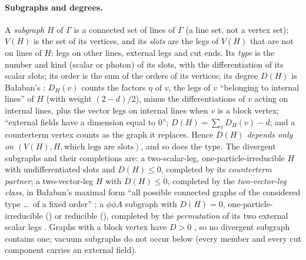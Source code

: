 \paragraph{Subgraphs and degrees.} A \emph{subgraph} $H$ of $\Gamma$ is a connected set of lines of $\Gamma$ (a line set, not a vertex set); $V(H)$ is the set of its vertices, and its \emph{slots} are the legs of $V(H)$ that are not on lines of $H$: legs on other lines, external legs and cut ends. Its \emph{type} is the number and kind (scalar or photon) of its slots, with the differentiation of its scalar slots; its order is the sum of the orders of its vertices; its degree $D(H)$ is Ba{\l}aban's \cite[(2.1)--(2.3)]{Ba3}: $D_H(v)$ counts the factors $\eta$ of $v$, the legs of $v$ ``belonging to internal lines'' of $H$ (with weight $(2-d)/2$), minus the differentiations of $v$ acting on internal lines, plus the vector legs on internal lines when $v$ is a block vertex; ``external fields have a dimension equal to $0$''; $D(H)=\sum_{v}D_H(v)-d$; and a counterterm vertex counts as the graph it replaces. Hence \emph{$D(H)$ depends only on $(V(H),H,\text{which legs are slots})$}, and so does the type. The divergent subgraphs and their completions \cite[pp.~420, 429--432]{Ba3} are: a two-scalar-leg, one-particle-irreducible $H$ with undifferentiated slots and $D(H)\le0$, completed by its \emph{counterterm partner}; a two-vector-leg $H$ with $D(H)\le0$, completed by the \emph{two-vector-leg class}, in Ba{\l}aban's maximal form ``all possible connected graphs of the considered type \dots\ of a fixed order'' \cite[p.~431]{Ba3}; a $\phi\phi A$ subgraph with $D(H)=0$, one-particle-irreducible (\cite[(2.18)--(2.20)]{Ba3}) or reducible (\cite[(2.21)--(2.22)]{Ba3}), completed by the \emph{permutation} of its two external scalar legs \cite[p.~429]{Ba3}. Graphs with a block vertex have $D>0$ \cite[Cor.~2.3]{Ba3}, so no divergent subgraph contains one; vacuum subgraphs do not occur below (every member and every cut component carries an external field).

